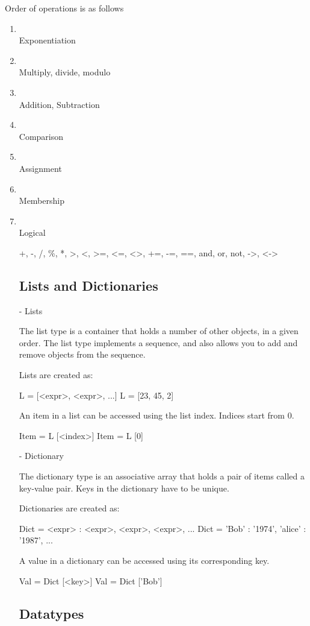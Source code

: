 Order of operations is as follows 
\begin{enumerate}
\item \\ Exponentiation
\item \\ Multiply, divide, modulo
\item \\ Addition, Subtraction
\item \\ Comparison
\item \\ Assignment
\item \\ Membership
\item \\ Logical

+, -, /, \%, *, >, <, >=, <=, <>, +=, -=, ==, and, or, not, ->, <->

\subsection{Lists and Dictionaries}

- Lists

The list type is a container that holds a number of other objects, in a given order.
The list type implements a sequence, and also allows you to add and remove objects from the sequence.

Lists are created as:

L = [<expr>, <expr>, ...]
L = [23, 45, 2]

An item in a list can be accessed using the list index. Indices start from 0.

Item = L [<index>]
Item = L [0]



- Dictionary

The dictionary type is an associative array that holds a pair of items called a key-value pair.
Keys in the dictionary have to be unique.

Dictionaries are created as:

Dict = {<expr> : <expr>, <expr>, <expr>, ...}
Dict = { 'Bob' : '1974', 'alice' : '1987', ...}

A value in a dictionary can be accessed using its corresponding key.

Val = Dict [<key>]
Val = Dict ['Bob']




\subsection{Datatypes}


\end{enumerate}
